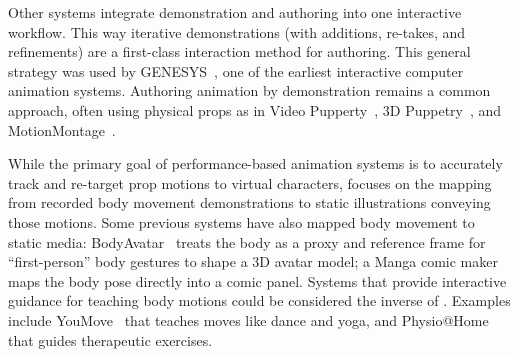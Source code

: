 Other systems integrate demonstration and authoring into one interactive workflow. This way iterative demonstrations (with additions, re-takes, and refinements) are a first-class interaction method for authoring.
This general strategy was used by GENESYS~\cite{Baecker:1969:GENESYS}, one of the earliest interactive computer animation systems. Authoring animation by demonstration remains a common approach, often using physical props as in Video Pupperty~\cite{Barnes:2008:VideoPuppetry}, 3D Puppetry~\cite{held20123d}, and MotionMontage~\cite{Gupta:2014:MotionMontage}.

While the primary goal of performance-based animation systems is to accurately track and re-target prop motions to virtual characters, \systemname{} focuses on the mapping from recorded body movement demonstrations to static illustrations conveying those motions.
Some previous systems have also mapped body movement to static media:
BodyAvatar~\cite{Zhang:2013:BodyAvatar} treats the body as a proxy and reference frame for ``first-person'' body gestures to shape a 3D avatar model;
a Manga comic maker~\cite{lumb_manga_2013} maps the body pose directly into a comic panel.
Systems that provide interactive guidance for teaching body motions could be considered the inverse of \systemname{}. Examples include YouMove~\cite{Anderson:2013:YEM:2501988.2502045} that teaches moves like dance and yoga, and Physio@Home~\cite{Tang:2014:Physio@Home} that guides therapeutic exercises.
%
%

